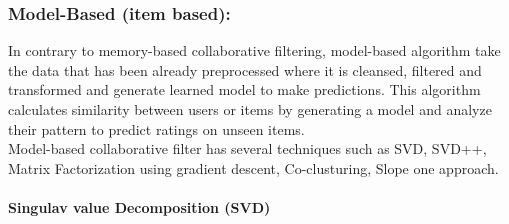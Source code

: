 \subsubsection{Model-Based (item based):}
In contrary to memory-based collaborative filtering, model-based algorithm take the data that has been already preprocessed where it is cleansed, filtered and transformed and generate learned model to make predictions. This algorithm calculates similarity between users or items by generating a model and analyze their pattern to predict ratings on unseen items.
\\
Model-based collaborative filter has several techniques such as SVD, SVD++, Matrix Factorization using gradient descent, Co-clusturing, Slope one approach.
\\
\paragraph{Singulav value Decomposition (SVD) }


